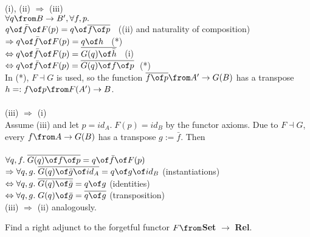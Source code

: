 	\begin{answer}
		(i), (ii) $\Rightarrow$ (iii)
		\\$\forall q \from B \to B', \forall f, p. \;$\\$ q \of \bar{f} \of F(p) = q \of \overline{f \of p}\;\;$ ((ii) and naturality of composition)\\
		$\Rightarrow q \of \bar{f} \of F(p)  = q \of h\;\;$ (*)\\
		$\Leftrightarrow  q \of \bar{f} \of F(p) = \overline{G(q) \of \bar{h}}\;\;$ (i)\\
		$\Leftrightarrow  q \of \bar{f} \of F(p)= \overline{G(q) \of f \of p}\;\;$(*)\\
		In (*), $F \dashv G$ is used, so the function  $\overline{f \of p} \from A' \to G(B)$ has a transpose $ h =: f \of p \from F(A') \to B$.\\\\
		(iii) $\Rightarrow$ (i)\\
		Assume (iii) and let $p = id_A. \; F(p) = id_B$ by the functor axioms. Due to $F \dashv G$, every $f\from A \to G(B)$ has a transpose $g := \bar{f}$. Then \\\\
		$\forall q, f. \; \overline{G(q) \of f \of p} = q \of \bar{f} \of F(p)$\\
		$\Rightarrow \forall q, g.  \;\overline{G(q) \of \bar{g} \of id_A} = q \of g \of id_B$ (instantiations) \\
		$\Leftrightarrow \forall q, g.  \;\overline{G(q) \of \bar{g}} = q \of g$ (identities)\\
		$\Leftrightarrow \forall q, g. \; G(q) \of \bar{g} = \overline{q \of g}$ (transposition)\\
		
		(iii)  $\Rightarrow$ (ii) analogously.
	\end{answer}
	
	
	\begin{exercise}
		Find a right adjunct to the forgetful functor $F \from $\textbf{Set }$ \to $\textbf{ Rel}.
	\end{exercise}
	
